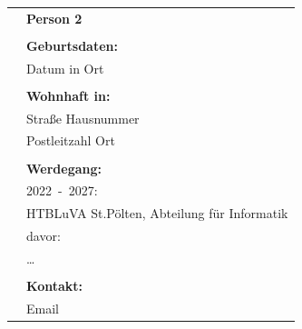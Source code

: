 \begin{tabular}{p{3cm}l}
     & \textbf{Person 2}                           \\
    \\
     & \textbf{Geburtsdaten:}                      \\
     & Datum in Ort                                \\
    \\
     & \textbf{Wohnhaft in:}                       \\
     & Straße Hausnummer                           \\
     & Postleitzahl Ort                            \\
    \\
     & \textbf{Werdegang:}                         \\
     & 2022~-~2027:                                 \\
     & HTBLuVA St.Pölten, Abteilung für Informatik \\
     & davor:                                      \\
     & \dots                                       \\
    \\
     & \textbf{Kontakt:}                           \\
     & Email                                       \\
\end{tabular}
